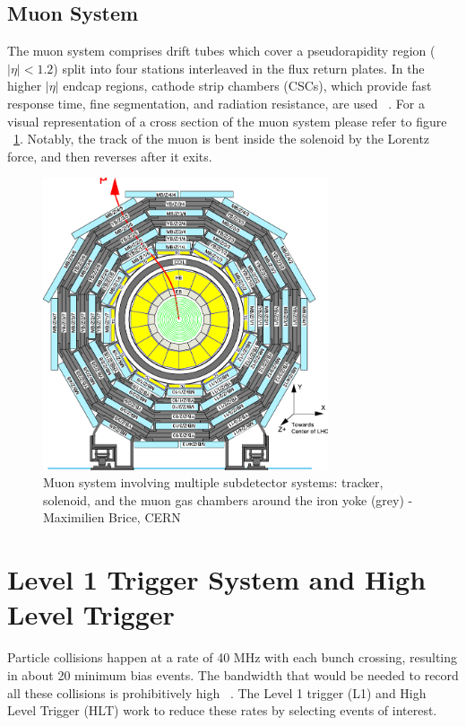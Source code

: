 \subsection{Muon System} 
The muon system comprises drift tubes which cover a pseudorapidity region ($|\eta|<1.2$) split into four stations interleaved in the flux return plates.
In the higher $|\eta|$ endcap regions, cathode strip chambers (CSCs), which provide fast response time, fine segmentation, and radiation resistance, are used ~\cite{Chatrchyan:1129810}. For a visual representation of a cross section of the muon system please refer to figure ~\ref{fig:muonsystem}. 
Notably, the track of the muon is bent inside the solenoid by the Lorentz force, and then reverses after it exits. 

\begin{figure}[ht!b]
  \centering
\includegraphics[width=0.75\textwidth]{figures/Layout-of-the-CMS-barrel-muon-DT-chambers-in-one-of-the-5-wheels-59.png}    
    \caption{\label{fig:muonsystem} Muon system involving multiple subdetector systems: tracker, solenoid, and the muon gas chambers around the iron yoke (grey) - Maximilien Brice, CERN }
\end{figure}


\section{Level 1 Trigger System and High Level Trigger}
Particle collisions happen at a rate of 40 MHz with each bunch crossing, resulting in about 20 minimum bias events. The bandwidth that would be needed to record all these collisions is prohibitively high ~\cite{Bruning:782076,Foudas:2232067}. The Level 1 trigger (L1) and High Level Trigger (HLT) work to reduce these rates by selecting events of interest. 

